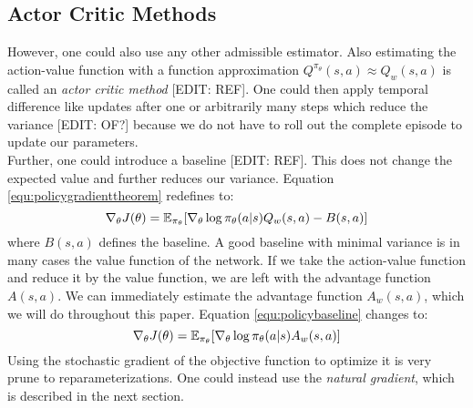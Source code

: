 \subsection{Actor Critic Methods}
However, one could also use any other admissible estimator. Also estimating the action-value function with a function approximation $Q^{\pi_\theta}(s, a) \approx Q_w(s,a)$ is called an \textit{actor critic method} [EDIT: REF]. One could then apply temporal difference like updates after one or arbitrarily many steps which reduce the variance [EDIT: OF?] because we do not have to roll out the complete episode to update our parameters.\\
Further, one could introduce a baseline [EDIT: REF]. This does not change the expected value and further reduces our variance. Equation \ref{equ:policygradienttheorem} redefines to:
\begin{equation}
\label{equ:policybaseline}
\nabla_{\theta}J(\theta)=\operatorname{\mathbb{E}}_{\pi_{\theta}}[\nabla_{\theta}\log\pi_{\theta}(a|s) Q_w(s, a) - B(s,a)]
\end{equation}
where $B(s, a)$ defines the baseline. A good baseline with minimal variance is in many cases the value function of the network. If we take the action-value function and reduce it by the value function, we are left with the advantage function $A(s,a)$. We can immediately estimate the advantage function $A_w(s,a)$, which we will do throughout this paper. Equation \ref{equ:policybaseline} changes to:
\begin{equation}
	\nabla_{\theta}J(\theta)=\operatorname{\mathbb{E}}_{\pi_{\theta}}[\nabla_{\theta}\log\pi_{\theta}(a|s) A_w(s, a)]
\end{equation}
Using the stochastic gradient of the objective function to optimize it is very prune to reparameterizations. One could instead use the \textit{natural gradient}, which is described in the next section.

